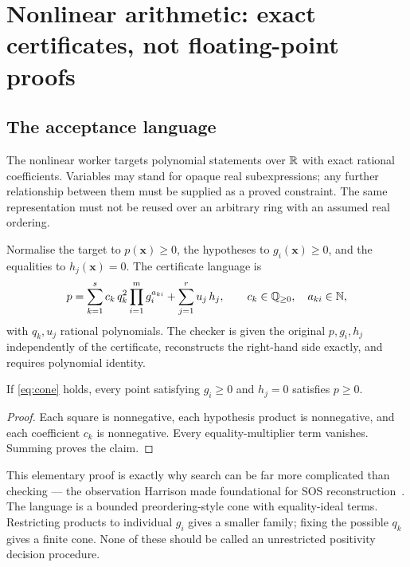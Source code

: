 \section{Nonlinear arithmetic: exact certificates, not floating-point proofs}
\label{sec:nonlinear}

\subsection{The acceptance language}

The nonlinear worker targets polynomial statements over $\mathbb{R}$ with exact rational
coefficients. Variables may stand for opaque real subexpressions; any further
relationship between them must be supplied as a proved constraint. The same
representation must not be reused over an arbitrary ring with an assumed real
ordering.

Normalise the target to $p(\bm x)\ge0$, the hypotheses to $g_i(\bm x)\ge0$, and
the equalities to $h_j(\bm x)=0$. The certificate language is
\begin{equation}
 p=\sum_{k=1}^{s}c_k\,q_k^2\prod_{i=1}^{m}g_i^{a_{ki}}
        +\sum_{j=1}^{r}u_j\,h_j,
 \qquad c_k\in\mathbb{Q}_{\ge0},\quad a_{ki}\in\mathbb{N},
 \label{eq:cone}
\end{equation}
with $q_k,u_j$ rational polynomials. The checker is given the original
$p,g_i,h_j$ independently of the certificate, reconstructs the right-hand side
exactly, and requires polynomial identity.

\begin{proposition}
\label{prop:cone}
If \eqref{eq:cone} holds, every point satisfying $g_i\ge0$ and $h_j=0$ satisfies
$p\ge0$.
\end{proposition}
\begin{proof}
Each square is nonnegative, each hypothesis product is nonnegative, and each
coefficient $c_k$ is nonnegative. Every equality-multiplier term vanishes.
Summing proves the claim.
\end{proof}

This elementary proof is exactly why search can be far more complicated than
checking --- the observation Harrison made foundational for SOS
reconstruction~\cite{harrison-sos}. The language is a bounded preordering-style
cone with equality-ideal terms. Restricting products to individual $g_i$ gives a
smaller family; fixing the possible $q_k$ gives a finite cone. None of these
should be called an unrestricted positivity decision procedure.

